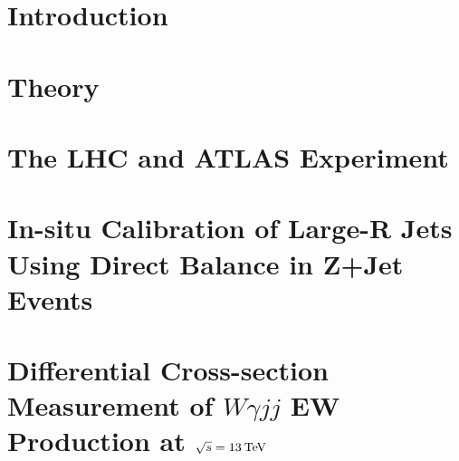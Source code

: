 \justifying
\setlength{\parindent}{0pt}
\newpage
\chapter{Introduction}
\label{sec:intro}

\FloatBarrier

\newpage
\chapter{Theory}
\label{sec:theory}

\FloatBarrier

%

\newpage
\chapter{The LHC and ATLAS Experiment}
\label{sec:atlasdetector}

\FloatBarrier

\newpage
\chapter{In-situ Calibration of Large-R Jets Using Direct Balance in Z+Jet Events}
\label{sec:insitu}

\FloatBarrier

\chapter{Differential Cross-section Measurement of $W\gamma jj$ EW Production at $\sqrt{s}=13\hspace{2pt}\text{Te\kern -0.1em V}$}
\label{sec:vbswy}

\FloatBarrier

